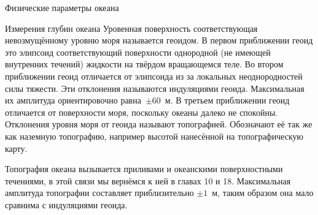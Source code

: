 \begin{chapter}{Физические параметры океана}
\begin{section}{Измерения глубин океана}
Уровенная поверхность соответствующая невозмущённому уровню моря
называется геоидом. В первом приближении геоид это элипсоид
соответствующий поверхности однородной (не имеющей внутренних течений)
жидкости на твёрдом вращающемся теле. Во втором приближении геоид
отличается от элипсоида из за локальных неоднородностей силы
тяжести. Эти отклонения называются индуляциями геоида. Максимальная их
амплитуда ориентировочно равна~$\pm 60$~м. В третьем приближении геоид
отличается от поверхности моря, поскольку океаны далеко не
спокойны. Отклонения уровня моря от геоида называют
топографией. Обозначают её так же как наземную топографию, например
высотой нанесённой на топографическую карту.
%

Топография океана вызывается приливами и океанскими поверхностными
течениями, в этой связи мы вернёмся к ней в главах 10 и
18. Максимальная амплитуда топографии составляет приблизительно 
$\pm 1$~м, таким образом она мало сравнима с индуляциями геоида.
%


\end{section}
\end{chapter}

